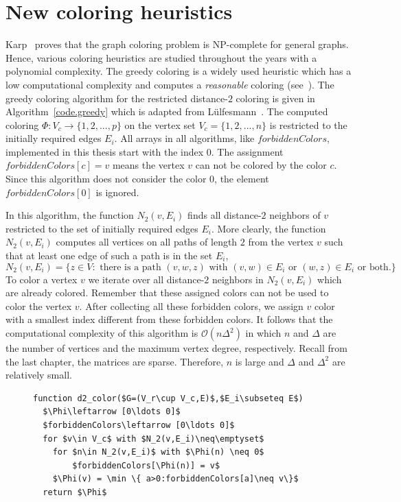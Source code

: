 \documentclass[12pt, twoside,a4paper,toc=bibliography]{scrbook}
\newcommand{\coderef}[1]{Algorithm~\protect\ref{#1}}
\begin{document}
\chapter{New coloring heuristics}
\label{package}
Karp~\cite{karp:1972} proves that the graph coloring problem is NP-complete for general graphs.
Hence, various coloring heuristics are studied throughout the years with a polynomial complexity.
The greedy coloring is a widely used heuristic which has a low computational complexity
and computes a \textit{reasonable} coloring (see~\cite{spaa14}).
The greedy coloring algorithm for the restricted distance-$2$ coloring
is given in \coderef{code.greedy} which is adapted from Lülfesmann~\cite{Lulfesmann2012Fap}.
The computed coloring $\Phi:V_c\to\{1,2,...,p\}$ on the vertex set $V_c=\{1,2,...,n\}$
is restricted to the initially required edges $E_i$.
All arrays in all algorithms, like $forbiddenColors$, 
implemented in this thesis start with the index $0$.
The assignment $forbiddenColors[c]=v$ means the vertex $v$ can not be colored
by the color $c$. Since this algorithm does not consider the color $0$,
the element $forbiddenColors[0]$ is ignored.

In this algorithm, the function $N_2(v,E_i)$ finds all distance-$2$ neighbors
of $v$ restricted to the set of initially required edges $E_i$. 
More clearly, the function $N_2(v,E_i)$ computes 
all vertices on all paths of length $2$ from the vertex $v$
such that at least one edge of such a path is in the set $E_i$,
$$
N_2(v,E_i)=\{ z\in V: \text{ there is a path } (v,w,z) \text{ with } (v,w)\in E_i
\text{ or } (w,z)\in E_i \text{ or both.}\} 
$$
To color a vertex $v$ we iterate over all distance-$2$ neighbors in $N_2(v,E_i)$ which are
already colored. Remember that these assigned colors can not be used to color the vertex $v$.
After collecting all these forbidden colors, we assign $v$ color with a smallest index different from 
these forbidden colors.
It follows that the computational complexity of this algorithm is $\mathcal{O}(n \Delta^2)$ in which $n$
and $\Delta$ are the number of vertices and the maximum vertex degree, respectively.
Recall from the last chapter, the matrices are sparse. Therefore, $n$ is large and $\Delta$ and $\Delta^2$
are relatively small.

\begin{figure}
\begin{lstlisting}[caption=The greedy algorithm for
the distance-$2$ coloring restricted to the edge set $E_i$
for columns.,label=code.greedy,mathescape]
function d2_color($G=(V_r\cup V_c,E)$,$E_i\subseteq E$)
  $\Phi\leftarrow [0\ldots 0]$
  $forbiddenColors\leftarrow [0\ldots 0]$
  for $v\in V_c$ with $N_2(v,E_i)\neq\emptyset$
    for $n\in N_2(v,E_i)$ with $\Phi(n) \neq 0$
        $forbiddenColors[\Phi(n)] = v$
    $\Phi(v) = \min \{ a>0:forbiddenColors[a]\neq v\}$
  return $\Phi$
\end{lstlisting}
\end{figure}
\end{document}
